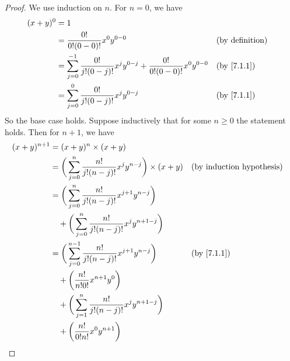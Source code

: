 \begin{proof}
  We use induction on \(n\).
  For \(n = 0\), we have
  \begin{align*}
    (x + y)^0 & = 1                                                                                                                           \\
              & = \dfrac{0!}{0!(0 - 0)!} x^0 y^{0 - 0}                                                          &  & \text{(by definition)}   \\
              & = \sum_{j = 0}^{-1} \dfrac{0!}{j!(0 - j)!} x^j y^{0 - j} + \dfrac{0!}{0!(0 - 0)!} x^0 y^{0 - 0} &  & \text{(by \cref{7.1.1})} \\
              & = \sum_{j = 0}^0 \dfrac{0!}{j!(0 - j)!} x^j y^{0 - j}                                           &  & \text{(by \cref{7.1.1})}
  \end{align*}
  So the base case holds.
  Suppose inductively that for some \(n \geq 0\) the statement holds.
  Then for \(n + 1\), we have
  \begin{align*}
    (x + y)^{n + 1} & = (x + y)^n \times (x + y)                                                                                                        \\
                    & = \bigg(\sum_{j = 0}^n \dfrac{n!}{j!(n - j)!} x^j y^{n - j}\bigg) \times (x + y)            &  & \text{(by induction hypothesis)} \\
                    & = \bigg(\sum_{j = 0}^n \dfrac{n!}{j!(n - j)!} x^{j + 1} y^{n - j}\bigg)                                                           \\
                    & \quad + \bigg(\sum_{j = 0}^n \dfrac{n!}{j!(n - j)!} x^j y^{n + 1 - j}\bigg)                                                       \\
                    & = \bigg(\sum_{j = 0}^{n - 1} \dfrac{n!}{j!(n - j)!} x^{j + 1} y^{n - j}\bigg)               &  & \text{(by \cref{7.1.1})}         \\
                    & \quad + \bigg(\dfrac{n!}{n!0!} x^{n + 1} y^0\bigg)                                                                                \\
                    & \quad + \bigg(\sum_{j = 1}^n \dfrac{n!}{j!(n - j)!} x^j y^{n + 1 - j}\bigg)                                                       \\
                    & \quad + \bigg(\dfrac{n!}{0!n!} x^0 y^{n + 1}\bigg)                                                                                \\

\end{align*}
\end{proof}
